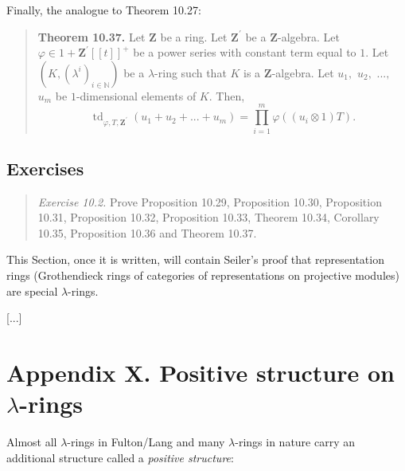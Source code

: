 \documentclass[numbers=enddot,12pt,final,onecolumn,notitlepage]{scrartcl}%
\newenvironment{noncompile}{}{}
\begin{document}
Finally, the analogue to Theorem 10.27:

\begin{quote}
\textbf{Theorem 10.37.} Let $\mathbf{Z}$ be a ring. Let $\mathbf{Z}^{\prime}$
be a $\mathbf{Z}$-algebra. Let $\varphi\in1+\mathbf{Z}^{\prime}\left[  \left[
t\right]  \right]  ^{+}$ be a power series with constant term equal to $1$.
Let $\left(  K,\left(  \lambda^{i}\right)  _{i\in\mathbb{N}}\right)  $ be a
$\lambda$-ring such that $K$ is a $\mathbf{Z}$-algebra. Let $u_{1},$ $u_{2},$
$...,$ $u_{m}$ be $1$-dimensional elements of $K$. Then,%
\[
\operatorname*{td}\nolimits_{\varphi,T,\mathbf{Z}^{\prime}}\left(  u_{1}%
+u_{2}+...+u_{m}\right)  =\prod\limits_{i=1}^{m}\varphi\left(  \left(
u_{i}\otimes1\right)  T\right)  .
\]


\bigskip
\end{quote}

\subsection{Exercises}

\begin{quotation}
\textit{Exercise 10.2.} Prove Proposition 10.29, Proposition 10.30,
Proposition 10.31, Proposition 10.32, Proposition 10.33, Theorem 10.34,
Corollary 10.35, Proposition 10.36 and Theorem 10.37.
\end{quotation}

\bigskip

\begin{noncompile}


This Section, once it is written, will contain Seiler's proof that
representation rings (Grothendieck rings of categories of representations on
projective modules) are special $\lambda$-rings.
\end{noncompile}

[...]

\section*{Appendix X. Positive structure on $\lambda$-rings}


Almost all $\lambda$-rings in Fulton/Lang \cite{FulLan85} and many $\lambda
$-rings in nature carry an additional structure called a \textit{positive
structure}:
\end{document}
